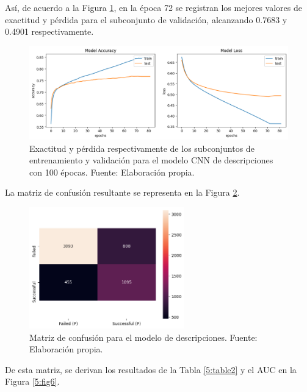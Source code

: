 Así, de acuerdo a la Figura \ref{5:fig4}, en la época 72 se registran los mejores valores de exactitud y pérdida para el subconjunto de validación, alcanzando 0.7683 y 0.4901 respectivamente.

\begin{figure}[!ht]
	\begin{center}
		\includegraphics[width=1\textwidth]{5/figures/description_model_acc_loss.png}
		\caption{Exactitud y pérdida respectivamente de los subconjuntos de entrenamiento y validación para el modelo CNN de descripciones con 100 épocas. Fuente: Elaboración propia.}
		\label{5:fig4}
	\end{center}
\end{figure}

La matriz de confusión resultante se representa en la Figura \ref{5:fig5}.

\begin{figure}[!ht]
	\begin{center}
		\includegraphics[width=0.60\textwidth]{5/figures/description_confusion_matrix.png}
		\caption{Matriz de confusión para el modelo de descripciones. Fuente: Elaboración propia.}
		\label{5:fig5}
	\end{center}
\end{figure}

De esta matriz, se derivan los resultados de la Tabla \ref{5:table2} y el AUC en la Figura \ref{5:fig6}.

